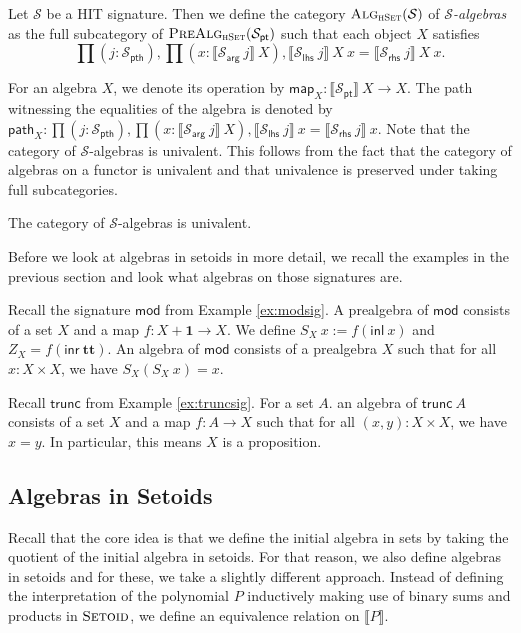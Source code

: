 \documentclass[9pt]{entcs}
\newcommand{\type}[1]{\textsc{#1}}
\newcommand{\term}[1]{\mathsf{#1}}
\newcommand{\constructor}[1]{\mathbf{#1}}
\newcommand{\category}[1]{\textsc{#1}}
\newcommand{\function}[1]{\mathsf{#1}}
\newcommand{\deprod}[3]{\prod(#1 : #2), #3} %
\newcommand{\hset}{\type{hSet}} %
\newcommand{\0}{\textbf{0}} %
\newcommand{\1}{\textbf{1}} %
\newcommand{\TT}{\constructor{tt}} %
\newcommand{\inl}{\term{inl}} %
\newcommand{\inr}{\term{inr}} %
\newcommand{\Def}{:=} %
\newcommand{\setoids}{\category{Setoid}} %
\newcommand{\pt}[0]{\textsf{pt}}
\newcommand{\pthI}[0]{\textsf{pth}}
\newcommand{\pthA}[0]{\textsf{arg}}
\newcommand{\pthlh}[0]{\textsf{lhs}}
\newcommand{\pthrh}[0]{\textsf{rhs}}
\newcommand{\pointc}[1]{#1_{\pt}} %
\newcommand{\pathI}[1]{#1_{\pthI}} %
\newcommand{\pathA}[1]{#1_{\pthA}} %
\newcommand{\pathlh}[1]{#1_{\pthlh}} %
\newcommand{\pathrh}[1]{#1_{\pthrh}} %
\newcommand{\modsig}{\function{mod}} %
\newcommand{\trunc}{\function{trunc}} %
\newcommand{\sig}{\mathcal{S}} %
\newcommand{\semP}[1]{\llbracket #1 \rrbracket} %
\newcommand{\prealg}[1]{\category{PreAlg}_{\hset}(#1)} %
\newcommand{\semE}[1]{\llbracket #1 \rrbracket} %
\newcommand{\Alg}[1]{\category{Alg}_{\hset}(#1)} %
\newcommand{\constrA}[1]{\function{map}_{#1}} %
\newcommand{\constrP}[1]{\function{path}_{#1}} %
\begin{document}
\begin{definition}
\label{def:algebra}
Let $\sig$ be a HIT signature.
Then we define the category $\Alg{\sig}$ of \emph{$\sig$-algebras} as the full subcategory of $\prealg{\pointc{\sig}}$ such that each object $X$ satisfies
\[
\deprod{j}{\pathI{\sig}}{\deprod{x}{\semP{\pathA{\sig} \> j} \> X}{\semE{\pathlh{\sig} \> j} \> X \> x = \semE{\pathrh{\sig} \> j} \> X \> x}}.
\]
\end{definition}

For an algebra $X$, we denote its operation by $\constrA{X} : \semP{\pointc{\sig}} \> X \rightarrow X$.
The path witnessing the equalities of the algebra is denoted by $\constrP{X} : \deprod{j}{\pathI{\sig}}{\deprod{x}{\semP{\pathA{\sig} \> j} \> X}{\semE{\pathlh{\sig} \> j} \> x = \semE{\pathrh{\sig} \> j} \> x}}$.
Note that the category of $\sig$-algebras is univalent.
This follows from the fact that the category of algebras on a functor is univalent and that univalence is preserved under taking full subcategories.

\begin{proposition}
\label{prop:univalg}
The category of $\sig$-algebras is univalent.
\end{proposition}

Before we look at algebras in setoids in more detail, we recall the examples in the previous section and look what algebras on those signatures are.

\begin{example}
\label{ex:commalg}
Recall the signature $\modsig$ from Example \ref{ex:modsig}.
A prealgebra of $\modsig$ consists of a set $X$ and a map $f : X + \1 \rightarrow X$.
We define $S_X \> x \Def f(\inl \> x)$ and $Z_X = f(\inr \> \TT)$.
An algebra of $\modsig$ consists of a prealgebra $X$ such that for all $x : X \times X$, we have $S_X(S_X \> x) = x$.
\end{example}

\begin{example}
\label{ex:truncalg}
Recall $\trunc$ from Example \ref{ex:truncsig}.
For a set $A$. an algebra of $\trunc \> A$ consists of a set $X$ and a map $f : A \rightarrow X$ such that for all $(x , y) : X \times X$, we have $x = y$.
In particular, this means $X$ is a proposition.
\end{example}

\subsection{Algebras in Setoids}
Recall that the core idea is that we define the initial algebra in sets by taking the quotient of the initial algebra in setoids.
For that reason, we also define algebras in setoids and for these, we take a slightly different approach.
Instead of defining the interpretation of the polynomial $P$ inductively making use of binary sums and products in $\setoids$, we define an equivalence relation on $\semP{P}$.
\end{document}
